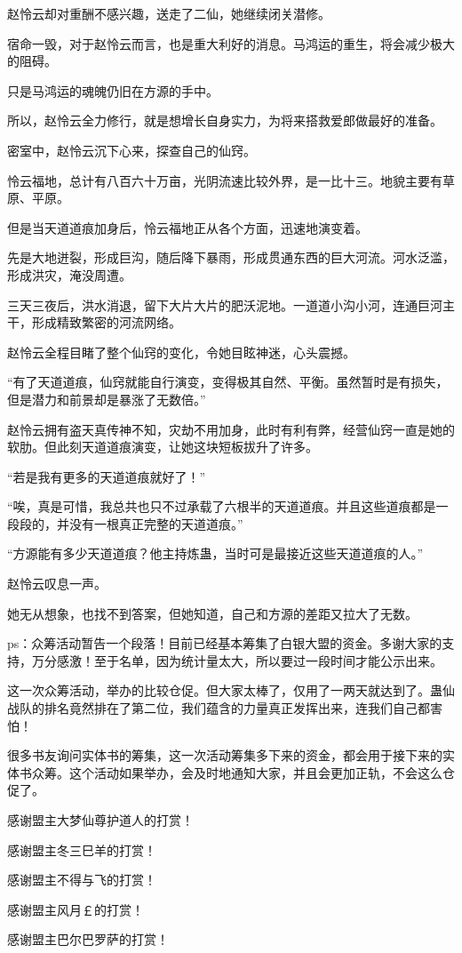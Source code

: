 \begin{this_body}
赵怜云却对重酬不感兴趣，送走了二仙，她继续闭关潜修。

宿命一毁，对于赵怜云而言，也是重大利好的消息。马鸿运的重生，将会减少极大的阻碍。

只是马鸿运的魂魄仍旧在方源的手中。

所以，赵怜云全力修行，就是想增长自身实力，为将来搭救爱郎做最好的准备。

密室中，赵怜云沉下心来，探查自己的仙窍。

怜云福地，总计有八百六十万亩，光阴流速比较外界，是一比十三。地貌主要有草原、平原。

但是当天道道痕加身后，怜云福地正从各个方面，迅速地演变着。

先是大地迸裂，形成巨沟，随后降下暴雨，形成贯通东西的巨大河流。河水泛滥，形成洪灾，淹没周遭。

三天三夜后，洪水消退，留下大片大片的肥沃泥地。一道道小沟小河，连通巨河主干，形成精致繁密的河流网络。

赵怜云全程目睹了整个仙窍的变化，令她目眩神迷，心头震撼。

“有了天道道痕，仙窍就能自行演变，变得极其自然、平衡。虽然暂时是有损失，但是潜力和前景却是暴涨了无数倍。”

赵怜云拥有盗天真传神不知，灾劫不用加身，此时有利有弊，经营仙窍一直是她的软肋。但此刻天道道痕演变，让她这块短板拔升了许多。

“若是我有更多的天道道痕就好了！”

“唉，真是可惜，我总共也只不过承载了六根半的天道道痕。并且这些道痕都是一段段的，并没有一根真正完整的天道道痕。”

“方源能有多少天道道痕？他主持炼蛊，当时可是最接近这些天道道痕的人。”

赵怜云叹息一声。

她无从想象，也找不到答案，但她知道，自己和方源的差距又拉大了无数。

ps：众筹活动暂告一个段落！目前已经基本筹集了白银大盟的资金。多谢大家的支持，万分感激！至于名单，因为统计量太大，所以要过一段时间才能公示出来。

这一次众筹活动，举办的比较仓促。但大家太棒了，仅用了一两天就达到了。蛊仙战队的排名竟然排在了第二位，我们蕴含的力量真正发挥出来，连我们自己都害怕！

很多书友询问实体书的筹集，这一次活动筹集多下来的资金，都会用于接下来的实体书众筹。这个活动如果举办，会及时地通知大家，并且会更加正轨，不会这么仓促了。

感谢盟主大梦仙尊护道人的打赏！

感谢盟主冬三巳羊的打赏！

感谢盟主不得与飞的打赏！

感谢盟主风月￡的打赏！

感谢盟主巴尔巴罗萨的打赏！

\end{this_body}

